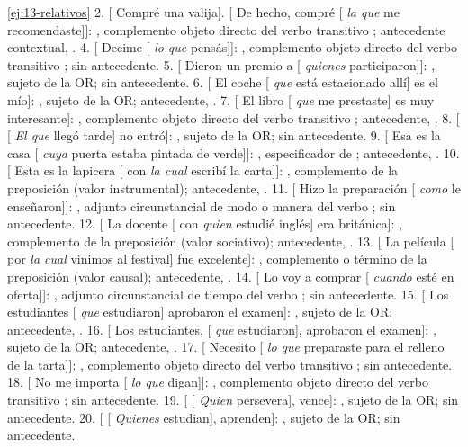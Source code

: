 \begin{solucion}{\ref{ej:13-relativos}}
2. [ Compré una valija]. [ De hecho, compré [
\textit{la que} me recomendaste]]: , complemento objeto directo del
verbo transitivo ; antecedente contextual, . 4.
[ Decime [ \textit{lo que} pensás]]: ,
complemento objeto directo del verbo transitivo ; sin antecedente.
5. [ Dieron un premio a [ \textit{quienes}
participaron]]: , sujeto de la OR; sin antecedente. 6.
[ El coche [ \textit{que} está estacionado allí] es el
mío]: , sujeto de la OR; antecedente, . 7. [
El libro [ \textit{que} me prestaste] es muy interesante]:
, complemento objeto directo del verbo transitivo ;
antecedente, . 8. [ [ \textit{El que} llegó
tarde] no entró]: , sujeto de la OR; sin antecedente. 9.
[ Esa es la casa [ \textit{cuya} puerta estaba pintada de
verde]]: , especificador de ; antecedente,
. 10. [ Esta es la lapicera [ con \textit{la
cual} escribí la carta]]: , complemento de la preposición
 (valor instrumental); antecedente, . 11.
[ Hizo la preparación [ \textit{como} le enseñaron]]:
, adjunto circunstancial de modo o manera del verbo
; sin antecedente. 12. [ La docente [ con
\textit{quien} estudié inglés] era británica]: , complemento de la
preposición  (valor sociativo); antecedente, . 13.
[ La película [ por \textit{la cual} vinimos al festival]
fue excelente]: , complemento o término de la preposición
 (valor causal); antecedente, . 14. [ Lo
voy a comprar [ \textit{cuando} esté en oferta]]: ,
adjunto circunstancial de tiempo del verbo ; sin antecedente. 15.
[ Los estudiantes [ \textit{que} estudiaron] aprobaron el
examen]: , sujeto de la OR; antecedente, . 16.
[ Los estudiantes, [ \textit{que} estudiaron], aprobaron el
examen]: , sujeto de la OR; antecedente, . 17.
[ Necesito [ \textit{lo que} preparaste para el relleno
de la tarta]]: , complemento objeto directo del verbo transitivo
; sin antecedente. 18. [ No me importa [
\textit{lo que} digan]]: , complemento objeto directo del verbo
transitivo ; sin antecedente. 19. [ [
\textit{Quien} persevera], vence]: , sujeto de la OR; sin
antecedente. 20. [ [ \textit{Quienes} estudian], aprenden]:
, sujeto de la OR; sin antecedente.
\end{solucion}

